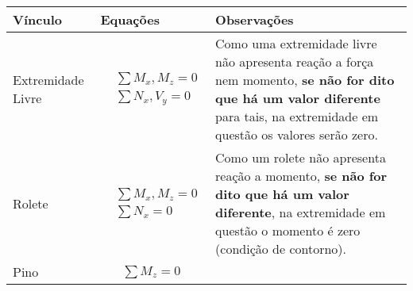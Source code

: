\documentclass{article}
\begin{document}
        \begin{table}[h]
            \tiny
            \centering
        \begin{tabularx}{\textwidth}{|X|X|X|}\hline
                \textbf{Vínculo} & \textbf{Equações} & \textbf{Observações} \\ \hline
                Extremidade Livre  & 
                    \begin{minipage}{.3\textwidth}
                        {\begin{align*}
                            &\sum M_x, M_z = 0 \\ 
                            &\sum N_x, V_y = 0
                        \end{align*}}
                    \end{minipage} &
                    
                    \begin{minipage}{.3\textwidth}
                        \vspace{5px}
                        Como uma extremidade livre não apresenta reação a força nem momento, \textbf{se não for dito que há um valor diferente} para tais, na extremidade em questão os valores serão zero.
                    \end{minipage} \\ \hline

                Rolete & 
                    \begin{minipage}{.3\textwidth}
                        {\begin{align*}
                            &\sum M_x, M_z = 0 \\ 
                            &\sum N_x = 0
                        \end{align*}}
                    \end{minipage} &
                    
                    \begin{minipage}{.3\textwidth}
                        \vspace{5px}
                        Como um rolete não apresenta reação a momento, \textbf{se não for dito que há um valor diferente}, na extremidade em questão  o momento é zero (condição de contorno).
                    \end{minipage} \\ \hline                       

                Pino & 
                    \begin{minipage}{.3\textwidth}
                        {\begin{align*}
                            \sum M_z = 0
                        \end{align*}}
                    \end{minipage} &
                    

\end{tabularx}
\end{table}
\end{document}
